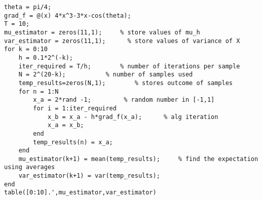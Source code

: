 \lstset{basicstyle=\footnotesize,style=myCustomMatlabStyle}
\begin{lstlisting}
theta = pi/4;
grad_f = @(x) 4*x^3-3*x-cos(theta);
T = 10;
mu_estimator = zeros(11,1);     % store values of mu_h
var_estimator = zeros(11,1);      % store values of variance of X
for k = 0:10
    h = 0.1*2^(-k);
    iter_required = T/h;        % number of iterations per sample
    N = 2^(20-k);           % number of samples used
    temp_results=zeros(N,1);        % stores outcome of samples
    for n = 1:N
        x_a = 2*rand -1;         % random number in [-1,1]
        for i = 1:iter_required
            x_b = x_a - h*grad_f(x_a);      % alg iteration
            x_a = x_b;
        end
        temp_results(n) = x_a;
    end
    mu_estimator(k+1) = mean(temp_results);     % find the expectation using averages
    var_estimator(k+1) = var(temp_results);
end
table([0:10].',mu_estimator,var_estimator)
\end{lstlisting}
